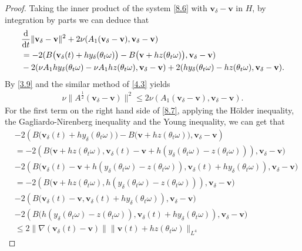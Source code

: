 \documentclass{elsarticle}
\theoremstyle{definition}
\numberwithin{equation}{section}
\renewcommand{\d}{{\rm{d}}}
\begin{document}
\begin{proof}
Taking the inner product of the system   \eqref{8.6} with $\textbf{v}_\delta-\textbf{v}$ in $H$,  by integration by parts we can deduce that
\begin{align}\label{8.7}
&\frac{\d }{\d t}\|\textbf{v}_\delta-\textbf{v}\|^2+2\nu(A_1(\textbf{v}_\delta-\textbf{v}),\textbf{v}_\delta-\textbf{v})\nonumber\\
&=-2(B\big( \textbf{v}_\delta(t)+hy_\delta(\theta_t\omega)\big)-B\big( \textbf{v}+hz(\theta_t\omega)\big),\textbf{v}_\delta-\textbf{v})\nonumber\\
&-  2(\nu A_1hy_\delta(\theta_t\omega)-\nu A_1hz(\theta_t\omega),\textbf{v}_\delta-\textbf{v})
+2(hy_\delta (\theta_t\omega)-hz(\theta_t\omega),\textbf{v}_\delta-\textbf{v}).
\end{align}
By \eqref{3.9} and the similar method of \eqref{4.3} yields
\begin{align}\label{8.8}
\nu\|A^\frac12(\textbf{v}_\delta-\textbf{v})\|^2\leq2\nu(A_1(\textbf{v}_\delta-\textbf{v}),\textbf{v}_\delta-\textbf{v}).
\end{align}
For the first term on the right hand side of \eqref{8.7}, applying the H\"{o}lder inequality, the Gagliardo-Nirenberg inequality and the Young inequality, we can get that
\begin{align}\label{8.9}
&-2(B\big( \textbf{v}_\delta(t)+hy_\delta(\theta_t\omega)\big)-B\big( \textbf{v}+hz(\theta_t\omega)\big),\textbf{v}_\delta-\textbf{v})\nonumber\\
&=-2(B\big(\textbf{v}+hz(\theta_t\omega),\textbf{v}_\delta(t)-\textbf{v}+h(y_\delta(\theta_t\omega)-z(\theta_t\omega)))
,\textbf{v}_\delta-\textbf{v}\big)\nonumber\\
&-2(B\big( \textbf{v}_\delta(t)-\textbf{v}+h(y_\delta(\theta_t\omega)-z(\theta_t\omega)),\textbf{v}_\delta(t)+hy_\delta(\theta_t\omega))
,\textbf{v}_\delta-\textbf{v}\big)\nonumber\\
&=-2(B\big(\textbf{v}+hz(\theta_t\omega),h(y_\delta(\theta_t\omega)-z(\theta_t\omega)))
,\textbf{v}_\delta-\textbf{v}\big)\nonumber\\
&-2(B\big( \textbf{v}_\delta(t)-\textbf{v},\textbf{v}_\delta(t)+hy_\delta(\theta_t\omega))
,\textbf{v}_\delta-\textbf{v}\big)\nonumber\\
&-2(B\big( h(y_\delta(\theta_t\omega)-z(\theta_t\omega)),\textbf{v}_\delta(t)+hy_\delta(\theta_t\omega))
,\textbf{v}_\delta-\textbf{v}\big)\nonumber\\
&\leq 2\|\nabla(\textbf{v}_\delta(t)-\textbf{v})\|\|\textbf{v}(t)+hz(\theta_t\omega)\|_{L^4}

\end{align}
\end{proof}
\end{document}
